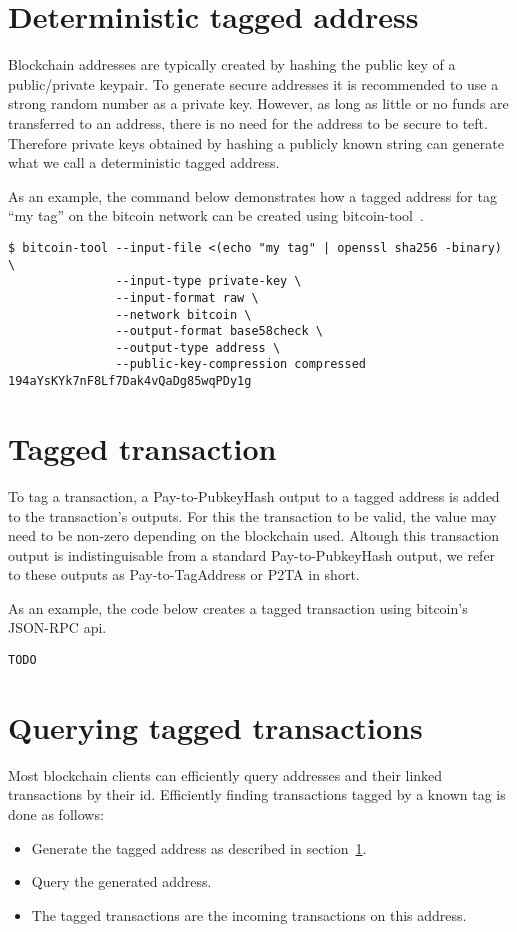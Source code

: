 \documentclass[a4paper,10pt]{article}
\begin{document}
\section{Deterministic tagged address}
\label{sec:taggedaddress}
Blockchain addresses are typically created by hashing the public key of a public/private keypair.
To generate secure addresses it is recommended to use a strong random number as a private key.
However, as long as little or no funds are transferred to an address, there is no need for the address to be secure to teft.
Therefore private keys obtained by hashing a publicly known string can generate what we call a deterministic tagged address.

As an example, the command below demonstrates how a tagged address for tag ``my tag'' on the bitcoin network can be created using bitcoin-tool~\cite{Matja}.
\begin{verbatim}
$ bitcoin-tool --input-file <(echo "my tag" | openssl sha256 -binary) \
               --input-type private-key \
               --input-format raw \
               --network bitcoin \
               --output-format base58check \
               --output-type address \
               --public-key-compression compressed
194aYsKYk7nF8Lf7Dak4vQaDg85wqPDy1g
\end{verbatim}

\section{Tagged transaction}
To tag a transaction, a Pay-to-PubkeyHash output to a tagged address is added to the transaction's outputs.
For this the transaction to be valid, the value may need to be non-zero depending on the blockchain used.
Altough this transaction output is indistinguisable from a standard Pay-to-PubkeyHash output, we refer to these outputs as Pay-to-TagAddress or P2TA in short.

As an example, the code below creates a tagged transaction using bitcoin's JSON-RPC api.
\begin{verbatim}
TODO
\end{verbatim}


\section{Querying tagged transactions}
Most blockchain clients can efficiently query addresses and their linked transactions by their id.
Efficiently finding transactions tagged by a known tag is done as follows:
\begin{itemize}
 \item Generate the tagged address as described in section~\ref{sec:taggedaddress}.
 \item Query the generated address.
 \item The tagged transactions are the incoming transactions on this address.
\end{itemize}
\end{document}
